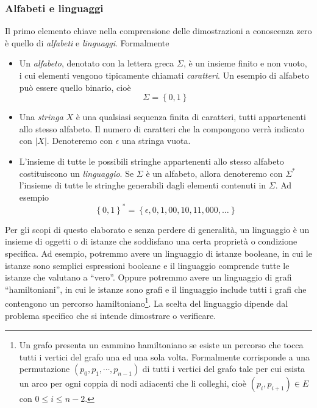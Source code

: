 \documentclass{article}
\theoremstyle{definition}
\begin{document}
\subsubsection{Alfabeti e linguaggi}\label{alfabetilinguaggi}
Il primo elemento chiave nella comprensione delle dimostrazioni a conoscenza zero è quello di \emph{alfabeti} e \emph{linguaggi}. 
Formalmente 
\begin{itemize}
    \item Un \emph{alfabeto}, denotato con la lettera greca $\Sigma$, è un insieme finito e non vuoto, i cui elementi vengono tipicamente chiamati \emph{caratteri}. Un esempio di alfabeto può essere quello binario, cioè 
    \begin{equation*}
        \Sigma = \left\{ 0, 1 \right\}
    \end{equation*} 
    \item Una \emph{stringa} $X$ è una qualsiasi sequenza finita di caratteri, tutti appartenenti allo stesso alfabeto. Il numero di caratteri che la compongono verrà indicato con $| X |$. Denoteremo con $\epsilon$ una stringa vuota.
    \item L'insieme di tutte le possibili stringhe appartenenti allo stesso alfabeto costituiscono un \emph{linguaggio}. Se $\Sigma$ è un alfabeto, allora denoteremo con $\Sigma^*$ l'insieme di tutte le stringhe generabili dagli elementi contenuti in $\Sigma$. Ad esempio
    \begin{equation*}
        \left\{ 0, 1 \right\}^* = \left\{\epsilon, 0, 1, 00, 10, 11, 000, \dots \right\}
    \end{equation*}
\end{itemize}
Per gli scopi di questo elaborato e senza perdere di generalità, un linguaggio è un insieme di oggetti o di istanze che soddisfano una certa proprietà o condizione specifica. Ad esempio, potremmo avere un linguaggio di istanze booleane, in cui le istanze sono semplici espressioni booleane e il linguaggio comprende tutte le istanze che valutano a ``vero''. Oppure potremmo avere un linguaggio di grafi ``hamiltoniani'', in cui le istanze sono grafi e il linguaggio include tutti i grafi che contengono un percorso hamiltoniano\footnote{Un grafo presenta un cammino hamiltoniano se esiste un percorso che tocca tutti i vertici del grafo una ed una sola volta. Formalmente corrisponde a una permutazione $(p_0, p_1, \cdots, p_{n-1})$ di tutti i vertici del grafo tale per cui esista un arco per ogni coppia di nodi adiacenti che li colleghi, cioè $(p_i, p_{i+1}) \in E$ con $0 \leq i \leq n-2$.}. La scelta del linguaggio dipende dal problema specifico che si intende dimostrare o verificare.
\end{document}

